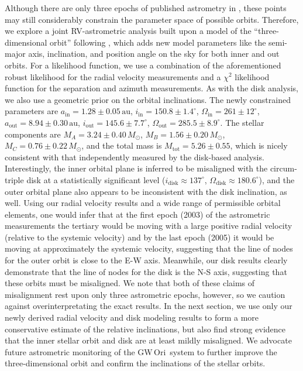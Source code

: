 \documentclass[twocolumn]{aastex61}
\newcommand{\gw}{GW\,Ori}
\begin{document}
Although there are only three epochs of published astrometry in \citet{berger11}, these points may still considerably constrain the parameter space of possible orbits. Therefore, we explore a joint RV-astrometric analysis built upon a model of the ``three-dimensional orbit'' following \citet{murray10}, which adds new model parameters like the semi-major axis, inclination, and position angle on the sky for both inner and out orbits. For a likelihood function, we use a combination of the aforementioned robust likelihood for the radial velocity measurements and a $\chi^2$ likelihood function for the separation and azimuth measurements. As with the disk analysis, we also use a geometric prior on the orbital inclinations. The newly constrained parameters are $a_\mathrm{in} = 1.28 \pm 0.05\,\mathrm{au}$, $i_\mathrm{in} = 150.8 \pm 1.4^\circ$, $\Omega_\mathrm{in} = 261 \pm 12^\circ$, $a_\mathrm{out} = 8.94 \pm 0.30\,\mathrm{au}$, $i_\mathrm{out} = 145.6\pm 7.7^\circ$, $\Omega_\mathrm{out} = 285.5 \pm 8.9^\circ$. The stellar components are $M_A = 3.24 \pm 0.40\,M_\odot$, $M_B = 1.56 \pm 0.20\,M_\odot$, $M_C = 0.76\pm 0.22\,M_\odot$, and the total mass is $M_\mathrm{tot} = 5.26 \pm 0.55$, which is nicely consistent with that independently measured by the disk-based analysis. Interestingly, the inner orbital plane is inferred to be misaligned with the circum-triple disk at a statistically significant level ($i_\mathrm{disk} \approx 137^\circ$, $\Omega_\mathrm{disk} \approx 180.6^\circ$), and the outer orbital plane also appears to be inconsistent with the disk inclination, as well. Using our radial velocity results and a wide range of permissible orbital elements, one would infer that at the first epoch (2003) of the \citet{berger11} astrometric measurements the tertiary would be moving with a large positive radial velocity (relative to the systemic velocity) and by the last epoch (2005) it would be moving at approximately the systemic velocity, suggesting that the line of nodes for the outer orbit is close to the E-W axis. Meanwhile, our disk results clearly demonstrate that the line of nodes for the disk is the N-S axis, suggesting that these orbits must be misaligned. We note that both of these claims of misalignment rest upon only three astrometric epochs, however, so we caution against overinterpretating the exact results. In the next section, we use only our newly derived radial velocity and disk modeling results to form a more conservative estimate of the relative inclinations, but also find strong evidence that the inner stellar orbit and disk are at least mildly misaligned. We advocate future astrometric monitoring of the \gw\ system to further improve the three-dimensional orbit and confirm the inclinations of the stellar orbits.
\end{document}
